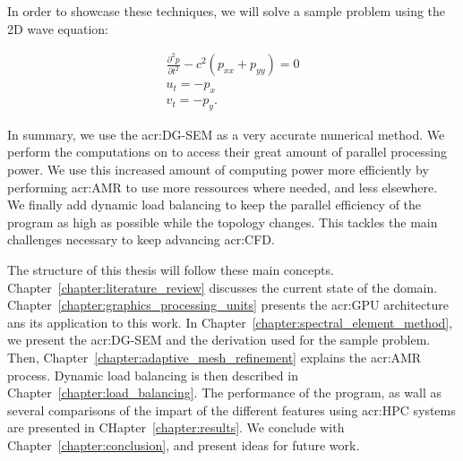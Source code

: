 In order to showcase these techniques, we will solve a sample problem using the 2D wave equation:

\begin{gather}
	\frac{\partial^2p}{\partial t^2} - c^2(p_{xx} + p_{yy}) = 0 \\
	u_t = - p_x \\
	v_t = -p_y.
\end{gather}

In summary, we use the \acrlong{acr:DG-SEM} as a very accurate numerical method. We perform the
computations on  to access their great amount of parallel processing power. We
use this increased amount of computing power more efficiently by performing \acrlong{acr:AMR} to use
more ressources where needed, and less elsewhere. We finally add dynamic load balancing to keep the
parallel efficiency of the program as high as possible while the topology changes. This tackles the
main challenges necessary to keep advancing \acrshort{acr:CFD}.

The structure of this thesis will follow these main concepts.
Chapter~\ref{chapter:literature_review} discusses the current state of the domain.
Chapter~\ref{chapter:graphics_processing_units} presents the \acrshort{acr:GPU} architecture ans its
application to this work. In Chapter~\ref{chapter:spectral_element_method}, we present the
\acrshort{acr:DG-SEM} and the derivation used for the sample problem. Then,
Chapter~\ref{chapter:adaptive_mesh_refinement} explains the \acrshort{acr:AMR} process. Dynamic load
balancing is then described in Chapter~\ref{chapter:load_balancing}. The performance of the program,
as wall as several comparisons of the impart of the different features using \acrshort{acr:HPC}
systems are presented in CHapter~\ref{chapter:results}. We conclude with
Chapter~\ref{chapter:conclusion}, and present ideas for future work.
